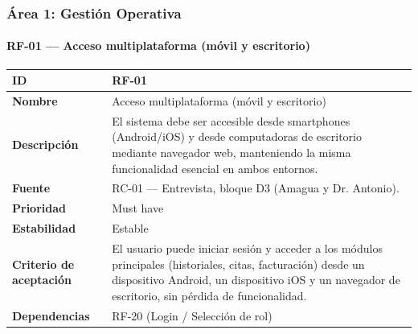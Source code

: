 \documentclass[
]{article}
\newcounter{none} %
\begin{document}
\subsubsection{Área 1: Gestión
Operativa}\label{uxe1rea-1-gestiuxf3n-operativa}

\paragraph{RF-01 --- Acceso multiplataforma (móvil y
escritorio)}\label{rf-01-acceso-multiplataforma-muxf3vil-y-escritorio}

{\def\LTcaptype{none} %
\begin{longtable}[]{@{}
  >{\raggedright\arraybackslash}p{}
  >{\raggedright\arraybackslash}p{}@{}}
\toprule\noalign{}
\begin{minipage}[b]{\linewidth}\raggedright
\textbf{ID}
\end{minipage} & \begin{minipage}[b]{\linewidth}\raggedright
RF-01
\end{minipage} \\
\midrule\noalign{}
\endhead
\bottomrule\noalign{}
\endlastfoot
\textbf{Nombre} & \begin{minipage}[t]{\linewidth}\raggedright
Acceso multiplataforma (móvil y escritorio)
\end{minipage} \\
\textbf{Descripción} & \begin{minipage}[t]{\linewidth}\raggedright
El sistema debe ser accesible desde smartphones (Android/iOS) y desde
computadoras de escritorio mediante navegador web, manteniendo la misma funcionalidad esencial en ambos entornos.
\end{minipage} \\
\textbf{Fuente} & \begin{minipage}[t]{\linewidth}\raggedright
RC-01 --- Entrevista, bloque D3 (Amagua y Dr. Antonio).
\end{minipage} \\
\textbf{Prioridad} & \begin{minipage}[t]{\linewidth}\raggedright
Must have
\end{minipage} \\
\textbf{Estabilidad} & \begin{minipage}[t]{\linewidth}\raggedright
Estable
\end{minipage} \\
\textbf{Criterio de aceptación} &
\begin{minipage}[t]{\linewidth}\raggedright
El usuario puede iniciar sesión y acceder a los módulos principales
(historiales, citas, facturación) desde un dispositivo Android, un dispositivo iOS y
un navegador de escritorio, sin pérdida de funcionalidad.
\end{minipage} \\
\textbf{Dependencias} & \begin{minipage}[t]{\linewidth}\raggedright
RF-20 (Login / Selección de rol)
\end{minipage} \\
\end{longtable}
}
\end{document}
